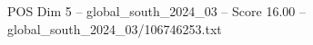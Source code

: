 \begin{textsample}{POS Dim 5 – global\_south\_2024\_03 – Score 16.00 – global\_south\_2024\_03/106746253.txt}
\end{textsample}
